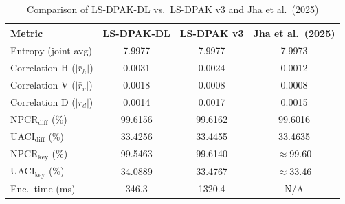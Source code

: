 \begin{table}[!ht]
\centering
\caption{Comparison of LS-DPAK-DL vs.\ LS-DPAK v3 and Jha et al.\ (2025)}
\label{tab:dl_comparison}
\begin{tabular}{lccc}
\hline
\textbf{Metric} & \textbf{LS-DPAK-DL} & \textbf{LS-DPAK v3} & \textbf{Jha et al.\ (2025)} \\
\hline
Entropy (joint avg)       & 7.9977 & 7.9977 & 7.9973 \\
Correlation H ($|\bar{r}_h|$) & 0.0031 & 0.0024 & 0.0012 \\
Correlation V ($|\bar{r}_v|$) & 0.0018 & 0.0008 & 0.0008 \\
Correlation D ($|\bar{r}_d|$) & 0.0014 & 0.0017 & 0.0015 \\
NPCR$_\text{diff}$ (\%)        & 99.6156 & 99.6162 & 99.6016 \\
UACI$_\text{diff}$ (\%)        & 33.4256 & 33.4455 & 33.4635 \\
NPCR$_\text{key}$ (\%)         & 99.5463 & 99.6140 & $\approx$99.60 \\
UACI$_\text{key}$ (\%)         & 34.0889 & 33.4767 & $\approx$33.46 \\
Enc.\ time (ms)           & 346.3 & 1320.4 & N/A \\
\hline
\end{tabular}
\end{table}
